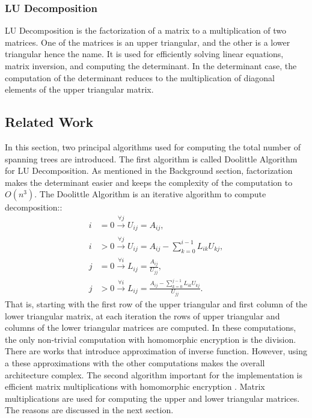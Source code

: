 \documentclass{winslabreport}
\begin{document}
\subsubsection{LU Decomposition}
LU Decomposition is the factorization of a matrix to a multiplication of two matrices. One of the matrices is an upper triangular, and the other is a lower triangular hence the name. It is used for efficiently solving linear equations, matrix inversion, and computing the determinant. In the determinant case, the computation of the determinant reduces to the multiplication of diagonal elements of the upper triangular matrix.

\subsection{Related Work}

In this section, two principal algorithms used for computing the total number of spanning trees are introduced. The first algorithm is called Doolittle Algorithm for LU Decomposition. As mentioned in the Background section, factorization makes the determinant easier and keeps the complexity of the computation to $O(n^3)$. The Doolittle Algorithm is an iterative algorithm to compute decomposition:\cite{doolittle}:
\begin{equation}
\label{eqn:dl_it}
\begin{split}
    i &= 0 \xrightarrow[]{\forall j} U_{ij} = A_{ij}, \\ 
    i &> 0 \xrightarrow[]{\forall j} U_{ij} = A_{ij} - \sum_{k=0}^{i-1} L_{ik}U_{kj}, \\
    j &= 0 \xrightarrow[]{\forall i} L_{ij} = \frac{A_{ij}}{U_{jj}}, \\
    j &> 0 \xrightarrow[]{\forall i} L_{ij} = \frac{A_{ij}- \sum_{k=0}^{j-1} L_{ik}U_{kj}}{U_{jj}}. 
\end{split}
\end{equation}
That is, starting with the first row of the upper triangular and first column of the lower triangular matrix, at each iteration the rows of upper triangular and columns of the lower triangular matrices are computed.
In these computations, the only non-trivial computation with homomorphic encryption is the division. There are works \cite{10.1007/978-3-319-70694-8_15} that introduce approximation of inverse function. However, using a these approximations with the other computations makes the overall architecture complex. 
The second algorithm important for the implementation is efficient matrix multiplications with homomorphic encryption \cite{10.1145/3243734.3243837}. Matrix multiplications are used for computing the upper and lower triangular matrices. The reasons are discussed in the next section.
\end{document}
